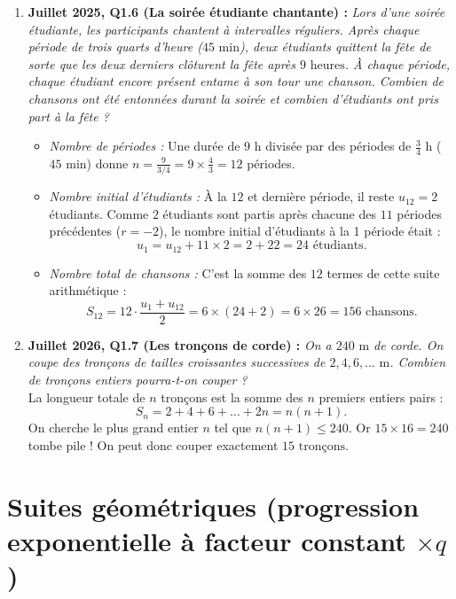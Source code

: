 \begin{exemple}
\begin{enumerate}
    \item \textbf{Juillet 2025, Q1.6 (La soirée étudiante chantante) :} \emph{Lors d'une soirée étudiante, les participants chantent à intervalles réguliers. Après chaque période de trois quarts d'heure ($45\text{ min}$), deux étudiants quittent la fête de sorte que les deux derniers clôturent la fête après $9\text{ heures}$. À chaque période, chaque étudiant encore présent entame à son tour une chanson. Combien de chansons ont été entonnées durant la soirée et combien d'étudiants ont pris part à la fête ?}\\
    \begin{itemize}
        \item \emph{Nombre de périodes :} Une durée de $9\text{ h}$ divisée par des périodes de $\frac{3}{4}\text{ h}$ ($45\text{ min}$) donne $n = \frac{9}{3/4} = 9 \times \frac{4}{3} = 12$ périodes.
        \item \emph{Nombre initial d'étudiants :} À la $12$\ieme{} et dernière période, il reste $u_{12} = 2$ étudiants. Comme $2$ étudiants sont partis après chacune des $11$ périodes précédentes ($r = -2$), le nombre initial d'étudiants à la 1\iere{} période était :
        \[
            u_1 = u_{12} + 11 \times 2 = 2 + 22 = \boxed{24\text{ étudiants}}.
        \]
        \item \emph{Nombre total de chansons :} C'est la somme des $12$ termes de cette suite arithmétique :
        \[
            S_{12} = 12 \cdot \frac{u_1 + u_{12}}{2} = 6 \times (24 + 2) = 6 \times 26 = \boxed{156\text{ chansons}}.
        \]
    \end{itemize}

    \item \textbf{Juillet 2026, Q1.7 (Les tronçons de corde) :} \emph{On a $240\text{ m}$ de corde. On coupe des tronçons de tailles croissantes successives de $2, 4, 6, \dots\text{ m}$. Combien de tronçons entiers pourra-t-on couper ?}\\
    La longueur totale de $n$ tronçons est la somme des $n$ premiers entiers pairs :
    \[
        S_n = 2 + 4 + 6 + \dots + 2n = n(n + 1).
    \]
    On cherche le plus grand entier $n$ tel que $n(n + 1) \le 240$. Or $15 \times 16 = 240$ tombe pile ! On peut donc couper exactement $\boxed{15\text{ tronçons}}$.
\end{enumerate}
\end{exemple}

\section{Suites géométriques (progression exponentielle à facteur constant $\times q$)}


